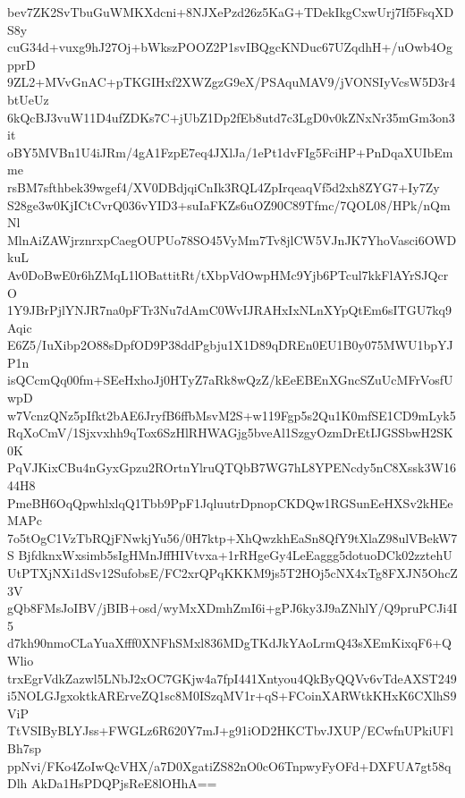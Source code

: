 bev7ZK2SvTbuGuWMKXdcni+8NJXePzd26z5KaG+TDekIkgCxwUrj7If5FsqXDS8y
cuG34d+vuxg9hJ27Oj+bWkszPOOZ2P1svIBQgcKNDuc67UZqdhH+/uOwb4OgpprD
9ZL2+MVvGnAC+pTKGIHxf2XWZgzG9eX/PSAquMAV9/jVONSIyVcsW5D3r4btUeUz
6kQcBJ3vuW11D4ufZDKs7C+jUbZ1Dp2fEb8utd7c3LgD0v0kZNxNr35mGm3on3it
oBY5MVBn1U4iJRm/4gA1FzpE7eq4JXlJa/1ePt1dvFIg5FciHP+PnDqaXUIbEmme
rsBM7sfthbek39wgef4/XV0DBdjqiCnIk3RQL4ZpIrqeaqVf5d2xh8ZYG7+Iy7Zy
S28ge3w0KjICtCvrQ036vYID3+suIaFKZs6uOZ90C89Tfmc/7QOL08/HPk/nQmNl
MlnAiZAWjrznrxpCaegOUPUo78SO45VyMm7Tv8jlCW5VJnJK7YhoVasci6OWDkuL
Av0DoBwE0r6hZMqL1lOBattitRt/tXbpVdOwpHMc9Yjb6PTcul7kkFlAYrSJQcrO
1Y9JBrPjlYNJR7na0pFTr3Nu7dAmC0WvIJRAHxIxNLnXYpQtEm6sITGU7kq9Aqic
E6Z5/IuXibp2O88sDpfOD9P38ddPgbju1X1D89qDREn0EU1B0y075MWU1bpYJP1n
isQCcmQq00fm+SEeHxhoJj0HTyZ7aRk8wQzZ/kEeEBEnXGncSZuUcMFrVosfUwpD
w7VcnzQNz5pIfkt2bAE6JryfB6ffbMsvM2S+w119Fgp5s2Qu1K0mfSE1CD9mLyk5
RqXoCmV/1Sjxvxhh9qTox6SzHlRHWAGjg5bveAl1SzgyOzmDrEtIJGSSbwH2SK0K
PqVJKixCBu4nGyxGpzu2ROrtnYlruQTQbB7WG7hL8YPENcdy5nC8Xssk3W1644H8
PmeBH6OqQpwhlxlqQ1Tbb9PpF1JqluutrDpnopCKDQw1RGSunEeHXSv2kHEeMAPc
7o5tOgC1VzTbRQjFNwkjYu56/0H7ktp+XhQwzkhEaSn8QfY9tXlaZ98ulVBekW7S
BjfdknxWxsimb5sIgHMnJffHIVtvxa+1rRHgeGy4LeEaggg5dotuoDCk02zztehU
UtPTXjNXi1dSv12SufobsE/FC2xrQPqKKKM9js5T2HOj5cNX4xTg8FXJN5OhcZ3V
gQb8FMsJoIBV/jBIB+osd/wyMxXDmhZmI6i+gPJ6ky3J9aZNhlY/Q9pruPCJi4I5
d7kh90nmoCLaYuaXfff0XNFhSMxl836MDgTKdJkYAoLrmQ43sXEmKixqF6+QWlio
trxEgrVdkZazwl5LNbJ2xOC7GKjw4a7fpI441Xntyou4QkByQQVv6vTdeAXST249
i5NOLGJgxoktkARErveZQ1sc8M0ISzqMV1r+qS+FCoinXARWtkKHxK6CXlhS9ViP
TtVSIByBLYJss+FWGLz6R620Y7mJ+g91iOD2HKCTbvJXUP/ECwfnUPkiUFlBh7sp
ppNvi/FKo4ZoIwQcVHX/a7D0XgatiZS82nO0cO6TnpwyFyOFd+DXFUA7gt58qDlh
AkDa1HsPDQPjsReE8lOHhA==

